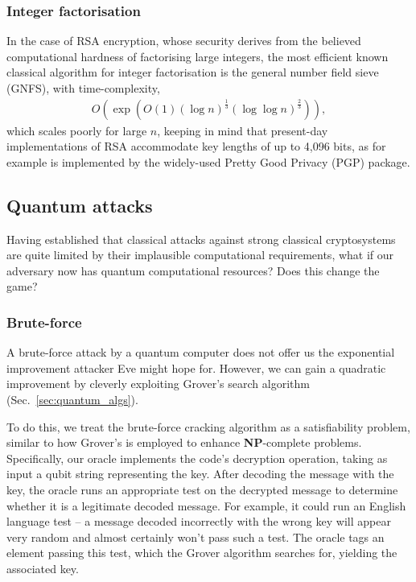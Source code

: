 \subsubsection{Integer factorisation}

In the case of RSA encryption, whose security derives from the believed computational hardness of factorising large integers, the most efficient known classical algorithm for integer factorisation is the general number field sieve (GNFS), with time-complexity,
\begin{align} \label{eq:GNFS_scaling}
	O(\exp (O(1) (\log n)^{\frac{1}{3}} (\log\log n)^{\frac{2}{3}})),
\end{align}
which scales poorly for large $n$, keeping in mind that present-day implementations of RSA accommodate key lengths of up to 4,096 bits, as for example is implemented by the widely-used Pretty Good Privacy (PGP) package.

%
%

\subsection{Quantum attacks}

Having established that classical attacks against strong classical cryptosystems are quite limited by their implausible computational requirements, what if our adversary now has quantum computational resources? Does this change the game?

%
%

\subsubsection{Brute-force}\label{sec:brute_force_attacks}

A brute-force attack by a quantum computer does not offer us the exponential improvement attacker Eve might hope for. However, we can gain a quadratic improvement by cleverly exploiting Grover's search algorithm (Sec.~\ref{sec:quantum_algs}).

To do this, we treat the brute-force cracking algorithm as a satisfiability problem, similar to how Grover's is employed to enhance \textbf{NP}-complete problems. Specifically, our oracle implements the code's decryption operation, taking as input a qubit string representing the key. After decoding the message with the key, the oracle runs an appropriate test on the decrypted message to determine whether it is a legitimate decoded message. For example, it could run an English language test -- a message decoded incorrectly with the wrong key will appear very random and almost certainly won't pass such a test. The oracle tags an element passing this test, which the Grover algorithm searches for, yielding the associated key.

